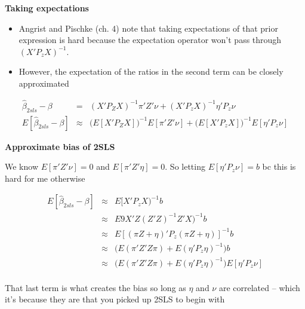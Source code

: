\documentclass[notes=show]{beamer}
\begin{document}
\begin{frame}[plain]
\begin{center}
\textbf{Taking expectations}
\end{center}

\begin{itemize}
\item Angrist and Pischke (ch. 4) note that taking expectations of that prior expression is hard because the expectation operator won't pass through $(X'P_zX)^{-1}$. 
\item However, the expectation of the ratios in the second term can be closely approximated
\end{itemize}

\begin{eqnarray*}
\widehat{\beta}_{2sls} - \beta  &=& (X'P_Z X)^{-1} \pi ' Z ' \nu + (X'P_zX)^{-1} \eta ' P_z \nu \\
E [ \widehat{\beta}_{2sls} - \beta ] &\approx & \bigg (E[X'P_Z X] \bigg ) ^{-1} E [\pi ' Z ' \nu ] + \bigg ( E [ X'P_zX] \bigg ) ^{-1}  E [ \eta ' P_z \nu ]
\end{eqnarray*}

\end{frame}

\begin{frame}[plain]
\begin{center}
\textbf{Approximate bias of 2SLS}
\end{center}

We know $E[\pi ' Z ' \nu ] =0$ and $E[ \pi ' Z ' \eta ] = 0$. So letting $E [ \eta ' P_z \nu ] = b$ bc this is hard for me otherwise

\begin{eqnarray*}
E [ \widehat{\beta}_{2sls} - \beta ] &\approx & E[X'P_z X)^{-1} b \\
& \approx & E 9 X' Z(Z'Z)^{-1} Z' X)^{-1} b \\
& \approx & E [ ( \pi Z + \eta ) ' P_z (\pi Z + \eta)]^{-1} b \\
& \approx & \bigg(  E (\pi ' Z'Z \pi) + E(\eta ' P_z \eta)^{-1} \bigg ) b \\
& \approx & \bigg ( E (\pi ' Z'Z \pi) + E(\eta ' P_z \eta)^{-1} \bigg ) E [ \eta ' P_z \nu ]  \\
\end{eqnarray*}

That last term is what creates the bias so long as $\eta$ and $\nu$ are correlated -- which it's because they are that you picked up 2SLS to begin with

\end{frame}
\end{document}
